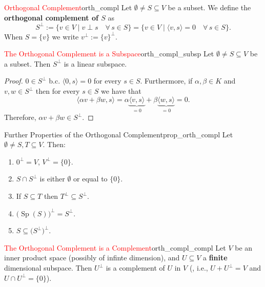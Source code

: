\begin{definition}{\textcolor{red}{Orthogonal Complement}}{orth_compl}
	Let $\emptyset \neq S \subseteq V$ be a subset. We define the \textbf{orthogonal complement of $S$} as
	\[
		S^{\perp} := \{v \in V \;|\; v \perp s \quad \forall \, s \in S\} = \{v \in V \; |\; \langle v , s \rangle = 0 \quad \forall \, s \in S\}.
	\]
	When $S = \{v\}$ we write $v^{\perp} := \{v\}^{\perp}$.
\end{definition}

\begin{lemma}{\textcolor{red}{The Orthogonal Complement is a Subspace}}{orth_compl_subsp}
	Let $\emptyset \neq S \subseteq V$ be a subset. Then $S^{\perp}$ is a linear subspace.
\end{lemma}

\begin{proof}
	$0 \in S^{\perp}$ b.c. $\langle 0, s\rangle = 0$ for every $s \in S$. Furthermore, if $\alpha , \beta \in K$ and $v, w \in S^{\perp}$ then for every $s \in S$ we have that
	\[
	\langle \alpha v + \beta w, s \rangle = \alpha \underbrace{\langle v, s\rangle}_{\displaystyle = 0} + \beta \underbrace{\langle w, s \rangle}_{\displaystyle = 0} = 0. 
	\]
	Therefore, $\alpha v + \beta w \in S^{\perp}$. \qedhere
\end{proof}


\begin{lemma}{Further Properties of the Orthogonal Complement}{prop_orth_compl}
	Let $\emptyset \neq S, T \subseteq V$. Then:
	\begin{enumerate}
		\item $0^{\perp} = V$, $V^{\perp} = \{0\}$.
		\item $S \cap S^{\perp}$ is either $\emptyset$ or equal to $\{0\}$.
		\item If $S \subseteq T$ then $T^{\perp} \subseteq S^{\perp}$.
		\item $\big(\operatorname{Sp}(S)\big)^{\perp} = S^{\perp}$.
		\item $S \subseteq \big(S^{\perp}\big)^{\perp}$.
	\end{enumerate}
\end{lemma}

\begin{theorem}{\textcolor{red}{The Orthogonal Complement is a Complement}}{orth_compl_compl}
	Let $V$ be an inner product space (possibly of infinte dimension), and $U \subseteq V$ a \textbf{finite} dimensional subspace. Then $U^{\perp}$ is a complement of $U$ in $V$ (, i.e., $U + U^{\perp} = V$ and $U \cap U^{\perp} = \{0\}$).
\end{theorem}

